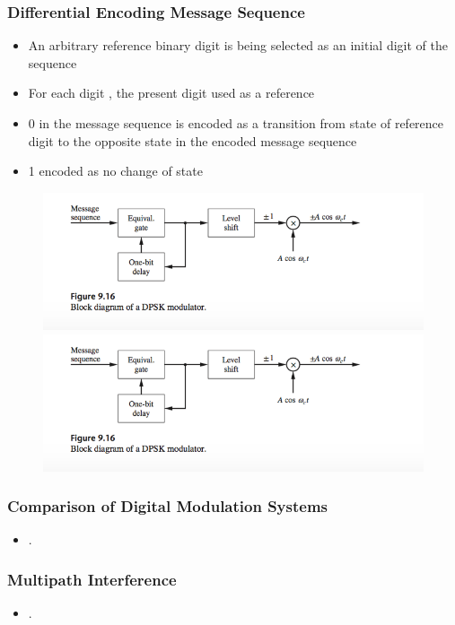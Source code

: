 \documentclass{beamer}
\begin{document}
\begin{frame}
	\frametitle{Differential Encoding Message Sequence}
	\begin{itemize}
		\item An arbitrary reference binary digit is being selected as an initial digit of the sequence
		\item For each digit , the present digit used as a reference
		\item 0 in the message sequence is encoded as  a transition from state of reference digit to the opposite state in the encoded message sequence
		\item 1 encoded as no change of state
	\end{itemize}
	\begin{figure}
		\includegraphics[width=\textwidth]{9_3_1.png}
		\includegraphics[width=\textwidth]{9_3_1.png}
	\end{figure}
\end{frame}


\begin{frame}
	\frametitle{Comparison of Digital Modulation Systems}
	\begin{itemize}
		\item .
	\end{itemize}
\end{frame}


\begin{frame}
	\frametitle{Multipath Interference}
	\begin{itemize}
		\item .
	\end{itemize}
\end{frame}
\end{document}
